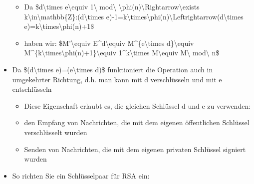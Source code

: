 \documentclass[a4paper]{article}
\begin{document}
\begin{multicols}{3}
\begin{itemize}
              \begin{itemize}
                  \item
                        Da \$d\textbackslash times e\textbackslash equiv 1\textbackslash{}
                        mod\textbackslash{}
                        \textbackslash phi(n)\textbackslash Rightarrow\textbackslash exists
                        k\textbackslash in\textbackslash mathbb\{Z\}:(d\textbackslash times
                        e)-1=k\textbackslash times\textbackslash phi(n)\textbackslash Leftrightarrow(d\textbackslash times
                        e)=k\textbackslash times\textbackslash phi(n)+1\$
                  \item
                        haben wir: \$M'\textbackslash equiv E\^{}d\textbackslash equiv
                        M\^{}\{e\textbackslash times d\}\textbackslash equiv
                        M\^{}\{k\textbackslash times\textbackslash phi(n)+1\}\textbackslash equiv
                        1\^{}k\textbackslash times M\textbackslash equiv M\textbackslash{}
                        mod\textbackslash{} n\$
              \end{itemize}
        \item
              Da \$(d\textbackslash times e)=(e\textbackslash times d)\$
              funktioniert die Operation auch in umgekehrter Richtung, d.h. man kann
              mit d verschlüsseln und mit e entschlüsseln

              \begin{itemize}
                  \item
                        Diese Eigenschaft erlaubt es, die gleichen Schlüssel d und e zu
                        verwenden:
                  \item
                        den Empfang von Nachrichten, die mit dem eigenen öffentlichen
                        Schlüssel verschlüsselt wurden
                  \item
                        Senden von Nachrichten, die mit dem eigenen privaten Schlüssel
                        signiert wurden
              \end{itemize}
        \item
              So richten Sie ein Schlüsselpaar für RSA ein:


\end{itemize}
\end{multicols}
\end{document}
